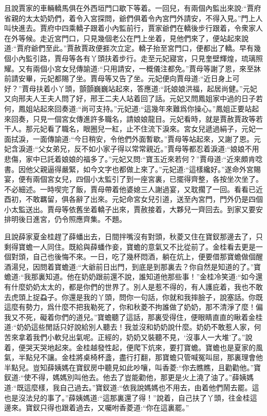 \begin{parag}
    且說賈家的車輛轎馬俱在外西垣門口歇下等着。一回兒，有兩個內監出來說:“賈府省親的太太奶奶們，着令入宮探問，爺們俱着令內宮門外請安，不得入見。”門上人叫快進去。賈府中四乘轎子跟着小內監前行，賈家爺們在轎後步行跟着，令衆家人在外等候。走近宮門口，只見幾個老公在門上坐着，見他們來了，便站起來說道:“賈府爺們至此。”賈赦賈政便捱次立定。轎子抬至宮門口，便都出了轎。早有幾個小內監引路，賈母等各有丫頭扶着步行。走至元妃寢宮，只見奎壁輝煌，琉璃照耀。又有兩個小宮女兒傳諭道:“只用請安，一概儀注都免。”賈母等謝了恩，來至牀前請安畢，元妃都賜了坐。賈母等又告了坐。元妃便向賈母道:“近日身上可好？”賈母扶着小丫頭，顫顫巍巍站起來，答應道:“託娘娘洪福，起居尚健。”元妃又向邢夫人王夫人問了好，邢王二夫人站着回了話。元妃又問鳳姐家中過的日子若何，鳳姐站起來回奏道:“尚可支持。”元妃道:“這幾年來難爲你操心。”鳳姐正要站起來回奏，只見一個宮女傳進許多職名，請娘娘龍目。元妃看時，就是賈赦賈政等若干人。那元妃看了職名，眼圈兒一紅，止不住流下淚來。宮女兒遞過絹子，元妃一面拭淚，一面傳諭道:“今日稍安，令他們外面暫歇。”賈母等站起來，又謝了恩。元妃含淚道:“父女弟兄，反不如小家子得以常常親近。”賈母等都忍着淚道:“娘娘不用悲傷，家中已託着娘娘的福多了。”元妃又問:“寶玉近來若何？”賈母道:“近來頗肯唸書。因他父親逼得嚴緊，如今文字也都做上來了。”元妃道:“這樣纔好。”遂命外宮賜宴，便有兩個宮女兒，四個小太監引了到一座宮裏，已擺得齊整，各按坐次坐了。不必細述。一時喫完了飯，賈母帶着他婆媳三人謝過宴，又耽擱了一回。看看已近酉初，不敢羈留，俱各辭了出來。元妃命宮女兒引道，送至內宮門，門外仍是四個小太監送出。賈母等依舊坐着轎子出來，賈赦接着，大夥兒一齊回去。到家又要安排明後日進宮，仍令照應齊集。不題。
\end{parag}


\begin{parag}
    且說薛家夏金桂趕了薛蟠出去，日間拌嘴沒有對頭，秋菱又住在寶釵那邊去了，只剩得寶蟾一人同住。既給與薛蟠作妾，寶蟾的意氣又不比從前了。金桂看去更是一個對頭，自己也後悔不來。一日，吃了幾杯悶酒，躺在炕上，便要借那寶蟾做個醒酒湯兒，因問着寶蟾道:“大爺前日出門，到底是到那裏去？你自然是知道的了。”寶蟾道:“我那裏知道。他在奶奶跟前還不說，誰知道他那些事！”金桂冷笑道:“如今還有什麼奶奶太太的，都是你們的世界了。別人是惹不得的，有人護庇着，我也不敢去虎頭上捉蝨子。你還是我的丫頭，問你一句話，你就和我摔臉子，說塞話。你既這麼有勢力，爲什麼不把我勒死了，你和秋菱不拘誰做了奶奶，那不清淨了麼！偏我又不死，礙着你們的道兒。”寶蟾聽了這話，那裏受得住，便眼睛直直的瞅着金桂道:“奶奶這些閒話只好說給別人聽去！我並沒和奶奶說什麼。奶奶不敢惹人家，何苦來拿着我們小軟兒出氣呢。正經的，奶奶又裝聽不見，‘沒事人一大堆’了。”說着，便哭天哭地起來。金桂越發性起，便爬下炕來，要打寶蟾。寶蟾也是夏家的風氣，半點兒不讓。金桂將桌椅杯盞，盡行打翻，那寶蟾只管喊冤叫屈，那裏理會他半點兒。豈知薛姨媽在寶釵房中聽見如此吵嚷，叫香菱:“你去瞧瞧，且勸勸他。”寶釵道:“使不得，媽媽別叫他去。他去了豈能勸他，那更是火上澆了油了。”薛姨媽道:“既這麼樣，我自己過去。”寶釵道:“依我說媽媽也不用去，由着他們鬧去罷。這也是沒法兒的事了。”薛姨媽道:“這那裏還了得！”說着，自己扶了丫頭，往金桂這邊來。寶釵只得也跟着過去，又囑咐香菱道:“你在這裏罷。”
\end{parag}


